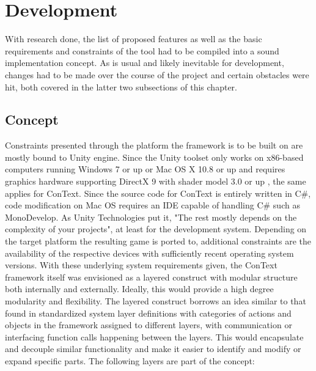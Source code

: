
\chapter{Development}\label{chapter:development}
With research done, the list of proposed features as well as the basic requirements and constraints of the tool had to be compiled into a sound implementation concept. As is usual and likely inevitable for development, changes had to be made over the course of the project and certain obstacles were hit, both covered in the latter two subsections of this chapter.

\section{Concept}
Constraints presented through the platform the framework is to be built on are mostly bound to Unity engine. Since the Unity toolset only works on x86-based computers running Windows 7 or up or Mac OS X 10.8 or up and requires graphics hardware supporting DirectX 9 with shader model 3.0 or up \cite{SREQ}, the same applies for ConText. Since the source code for ConText is entirely written in C\#, code modification on Mac OS requires an IDE capable of handling C\# such as MonoDevelop. As Unity Technologies put it, "The rest mostly depends on the complexity of your projects", at least for the development system. Depending on the target platform the resulting game is ported to, additional constraints are the availability of the respective devices with sufficiently recent operating system versions.
With these underlying system requirements given, the ConText framework itself was envisioned as a layered construct with modular structure both internally and externally. Ideally, this would provide a high degree modularity and flexibility. 
The layered construct borrows an idea similar to that found in standardized system layer definitions with categories of actions and objects in the framework assigned to different layers, with communication or interfacing function calls happening between the layers. This would encapsulate and decouple similar functionality and make it easier to identify and modify or expand specific parts. The following layers are part of the concept:
